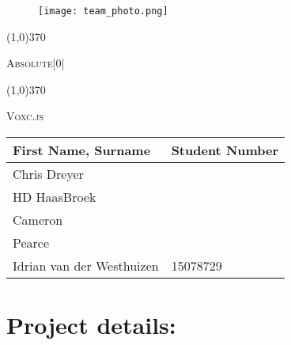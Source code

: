 \documentclass[english]{article}
\begin{document}
	
	
	\begin{figure}
		\texttt{[image: team\_photo.png]}
	\end{figure}
	
	\begin{center}
		\line(1,0){370}
		\\[0.2cm]
		{\scshape\Large Absolute|0|  \par}
		\vspace{0.1cm}
		\line(1,0){370}
		\\[0.8cm]
		
		{\scshape\Large Voxc.js \par}
		\vspace{0.9cm}
		
		\begin{tabu} to \textwidth { X[l] X[l]}
			\hline
			\textbf{First Name, Surname  }	& \textbf{Student Number}	\\ \hline \hline
			Chris Dreyer   	&	\\ \hline
			HD HaasBroek  	&	\\ \hline
			Cameron   		&	\\ \hline
			Pearce    		&	\\ \hline
			Idrian van der Westhuizen    &15078729	\\ \hline
			\hline
		\end{tabu}
		
	\end{center}
	
	
	\newpage
	\tableofcontents
	
	\newpage

	\section*{Project details:}
	\newline
	
\end{document}

